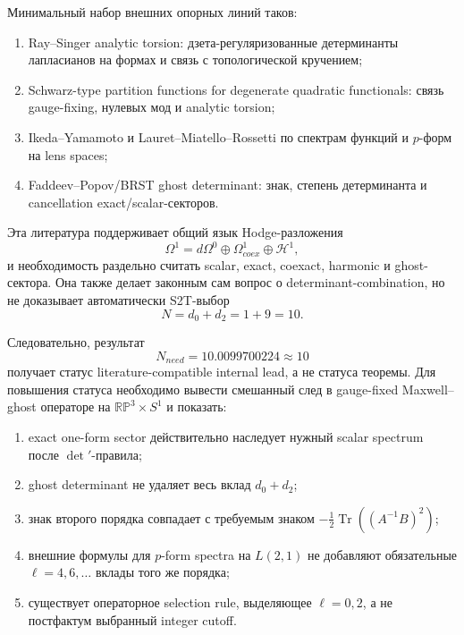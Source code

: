 \documentclass[12pt,a4paper]{report}
\theoremstyle{remark}
\DeclareMathOperator{\Tr}{Tr}
\begin{document}
Минимальный набор внешних опорных линий таков:
\begin{enumerate}
    \item Ray--Singer analytic torsion: дзета-регуляризованные детерминанты лапласианов на формах и связь с топологической кручением;
    \item Schwarz-type partition functions for degenerate quadratic functionals: связь gauge-fixing, нулевых мод и analytic torsion;
    \item Ikeda--Yamamoto и Lauret--Miatello--Rossetti по спектрам функций и \(p\)-форм на lens spaces;
    \item Faddeev--Popov/BRST ghost determinant: знак, степень детерминанта и cancellation exact/scalar-секторов.
\end{enumerate}

Эта литература поддерживает общий язык Hodge-разложения
\begin{equation}
    \Omega^1=d\Omega^0\oplus \Omega^1_{coex}\oplus \mathcal{H}^1,
\end{equation}
и необходимость раздельно считать scalar, exact, coexact, harmonic и ghost-сектора. Она также делает законным сам вопрос о determinant-combination, но не доказывает автоматически S2T-выбор
\begin{equation}
    N=d_0+d_2=1+9=10.
\end{equation}

Следовательно, результат
\begin{equation}
    N_{need}=10.0099700224\approx10
\end{equation}
получает статус literature-compatible internal lead, а не статуса теоремы. Для повышения статуса необходимо вывести смешанный след в gauge-fixed Maxwell--ghost операторе на \(\mathbb{RP}^3\times S^1\) и показать:
\begin{enumerate}
    \item exact one-form sector действительно наследует нужный scalar spectrum после \(\det'\)-правила;
    \item ghost determinant не удаляет весь вклад \(d_0+d_2\);
    \item знак второго порядка совпадает с требуемым знаком \(-\frac12\Tr((A^{-1}B)^2)\);
    \item внешние формулы для \(p\)-form spectra на \(L(2,1)\) не добавляют обязательные \(\ell=4,6,\ldots\) вклады того же порядка;
    \item существует операторное selection rule, выделяющее \(\ell=0,2\), а не постфактум выбранный integer cutoff.
\end{enumerate}
\end{document}
